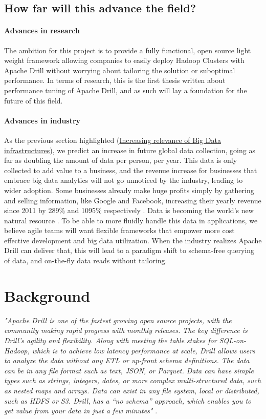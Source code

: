 \documentclass[a4paper,english]{report}
\begin{document}
		\section{How far will this advance the field?}
			\subsubsection{Advances in research}
			The ambition for this project is to provide a fully functional, open source light weight framework allowing companies to easily deploy Hadoop Clusters with Apache Drill without worrying about tailoring the solution or suboptimal performance. In terms of research, this is the first thesis written about performance tuning of Apache Drill, and as such will lay a foundation for the future of this field.
			\subsubsection{Advances in industry}
			As the previous section highlighted (\hyperref[big_data]{Increasing relevance of Big Data infrastructures}), we predict an increase in future global data collection, going as far as doubling the amount of data per person, per year. This data is only collected to add value to a business, and the revenue increase for businesses that embrace big data analytics will not go unnoticed by the industry, leading to wider adoption. Some businesses already make huge profits simply by gathering and selling information, like Google and Facebook, increasing their yearly revenue since 2011 by 289\% and 1095\% respectively \cite{statista}. Data is becoming the world’s new natural resource \cite{future_data}. To be able to more fluidly handle this data in applications, we believe agile teams will want flexible frameworks that empower more cost effective development and big data utilization. When the industry realizes Apache Drill can deliver that, this will lead to a paradigm shift to schema-free querying of data, and on-the-fly data reads without tailoring.

		
	\chapter{Background}
	\emph{"Apache Drill is one of the fastest growing open source projects, with the community making rapid progress with monthly releases. The key difference is Drill’s agility and flexibility. Along with meeting the table stakes for SQL-on-Hadoop, which is to achieve low latency performance at scale, Drill allows users to analyze the data without any ETL or up-front schema definitions. The data can be in any file format such as text, JSON, or Parquet. Data can have simple types such as strings, integers, dates, or more complex multi-structured data, such as nested maps and arrays. Data can exist in any file system, local or distributed, such as HDFS or S3. Drill, has a “no schema” approach, which enables you to get value from your data in just a few minutes"} \cite{drill}.
	
\end{document}
